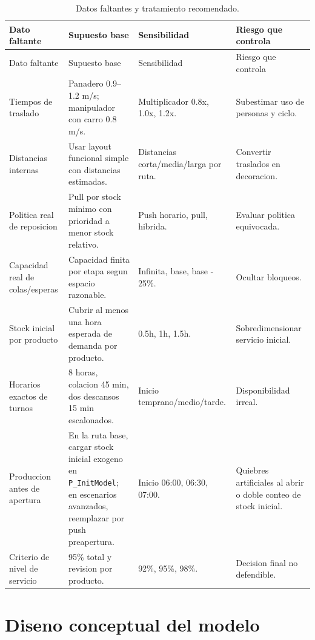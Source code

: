 \documentclass[11pt]{article}
\newcommand{\proc}[1]{\texttt{#1}}
\begin{document}
\begin{longtable}{L{3.5cm}L{4.0cm}L{3.9cm}L{3.7cm}}
\caption{Datos faltantes y tratamiento recomendado.}\\
\toprule
{}
\color{white}Dato faltante & \color{white}Supuesto base & \color{white}Sensibilidad & \color{white}Riesgo que controla \\
\midrule
\endfirsthead
\toprule
{}
\color{white}Dato faltante & \color{white}Supuesto base & \color{white}Sensibilidad & \color{white}Riesgo que controla \\
\midrule
\endhead
Tiempos de traslado & Panadero 0.9--1.2 m/s; manipulador con carro 0.8 m/s. & Multiplicador 0.8x, 1.0x, 1.2x. & Subestimar uso de personas y ciclo. \\
Distancias internas & Usar layout funcional simple con distancias estimadas. & Distancias corta/media/larga por ruta. & Convertir traslados en decoracion. \\
Politica real de reposicion & Pull por stock minimo con prioridad a menor stock relativo. & Push horario, pull, hibrida. & Evaluar politica equivocada. \\
Capacidad real de colas/esperas & Capacidad finita por etapa segun espacio razonable. & Infinita, base, base - 25\%. & Ocultar bloqueos. \\
Stock inicial por producto & Cubrir al menos una hora esperada de demanda por producto. & 0.5h, 1h, 1.5h. & Sobredimensionar servicio inicial. \\
Horarios exactos de turnos & 8 horas, colacion 45 min, dos descansos 15 min escalonados. & Inicio temprano/medio/tarde. & Disponibilidad irreal. \\
Produccion antes de apertura & En la ruta base, cargar stock inicial exogeno en \proc{P\_InitModel}; en escenarios avanzados, reemplazar por push preapertura. & Inicio 06:00, 06:30, 07:00. & Quiebres artificiales al abrir o doble conteo de stock inicial. \\
Criterio de nivel de servicio & 95\% total y revision por producto. & 92\%, 95\%, 98\%. & Decision final no defendible. \\
\bottomrule
\end{longtable}

\section{Diseno conceptual del modelo}
\end{document}
